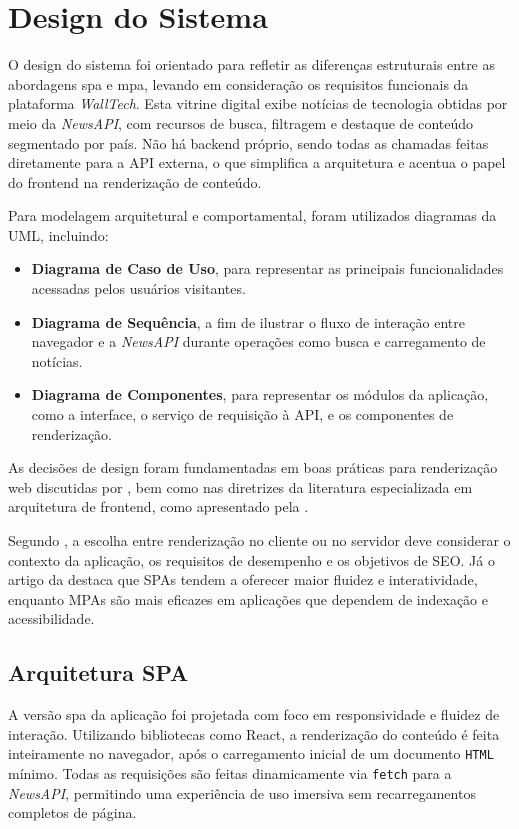 \section{Design do Sistema}
\label{cap:design}

O design do sistema foi orientado para refletir as diferenças estruturais entre as abordagens \acrshort{spa} e \acrshort{mpa}, levando em consideração os requisitos funcionais da plataforma \textit{WallTech}. Esta vitrine digital exibe notícias de tecnologia obtidas por meio da \textit{NewsAPI}, com recursos de busca, filtragem e destaque de conteúdo segmentado por país. Não há backend próprio, sendo todas as chamadas feitas diretamente para a API externa, o que simplifica a arquitetura e acentua o papel do frontend na renderização de conteúdo.

Para modelagem arquitetural e comportamental, foram utilizados diagramas da UML, incluindo:
\begin{itemize}
  \item \textbf{Diagrama de Caso de Uso}, para representar as principais funcionalidades acessadas pelos usuários visitantes.
  \item \textbf{Diagrama de Sequência}, a fim de ilustrar o fluxo de interação entre navegador e a \textit{NewsAPI} durante operações como busca e carregamento de notícias.
  \item \textbf{Diagrama de Componentes}, para representar os módulos da aplicação, como a interface, o serviço de requisição à API, e os componentes de renderização.
\end{itemize}

As decisões de design foram fundamentadas em boas práticas para renderização web discutidas por \cite{osmani2025}, bem como nas diretrizes da literatura especializada em arquitetura de frontend, como apresentado pela \cite{atori2024}.

Segundo \cite{osmani2025}, a escolha entre renderização no cliente ou no servidor deve considerar o contexto da aplicação, os requisitos de desempenho e os objetivos de SEO. Já o artigo da \cite{atori2024} destaca que SPAs tendem a oferecer maior fluidez e interatividade, enquanto MPAs são mais eficazes em aplicações que dependem de indexação e acessibilidade.

\subsection{Arquitetura SPA}

A versão \acrshort{spa} da aplicação foi projetada com foco em responsividade e fluidez de interação. Utilizando bibliotecas como React, a renderização do conteúdo é feita inteiramente no navegador, após o carregamento inicial de um documento \texttt{HTML} mínimo. Todas as requisições são feitas dinamicamente via \texttt{fetch} para a \textit{NewsAPI}, permitindo uma experiência de uso imersiva sem recarregamentos completos de página.

